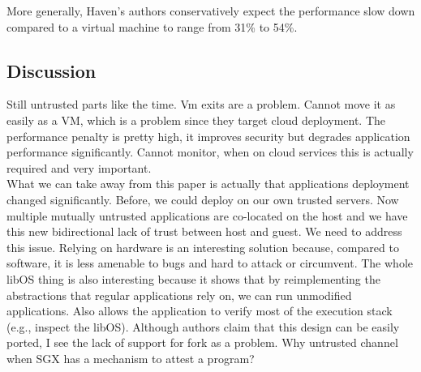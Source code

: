 More generally, Haven's authors conservatively expect the performance slow down compared to a virtual machine to range from 31\% to 54\%.
\subsection{Discussion}

Still untrusted parts like the time.
Vm exits are a problem.
Cannot move it as easily as a VM, which is a problem since they target cloud deployment.
The performance penalty is pretty high, it improves security but degrades application performance significantly.
Cannot monitor, when on cloud services this is actually required and very important.\\

What we can take away from this paper is actually that applications deployment changed significantly.
Before, we could deploy on our own trusted servers.
Now multiple mutually untrusted applications are co-located on the host and we have this new bidirectional lack of trust between host and guest.
We need to address this issue.
Relying on hardware is an interesting solution because, compared to software, it is less amenable to bugs and hard to attack or circumvent.
The whole libOS thing is also interesting because it shows that by reimplementing the abstractions that regular applications rely on, we can run unmodified applications.
Also allows the application to verify most of the execution stack (e.g., inspect the libOS).
Although authors claim that this design can be easily ported, I see the lack of support for fork as a problem.
Why untrusted channel when SGX has a mechanism to attest a program?





